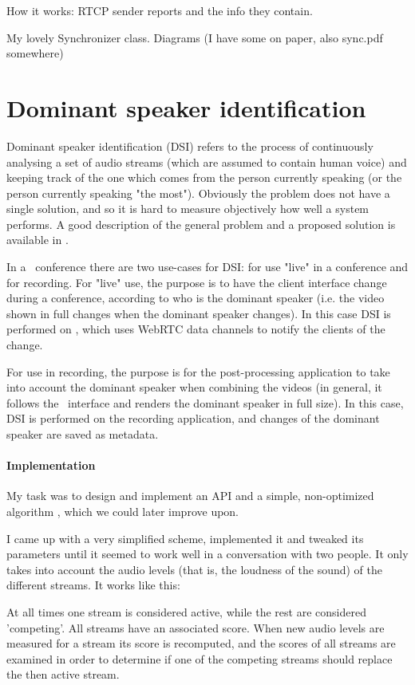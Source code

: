 \documentclass[twoside,openright,a4paper,11pt,english]{article}
\begin{document}
How it works: RTCP sender reports and the info they contain.

My lovely Synchronizer class. Diagrams (I have some on paper, also sync.pdf somewhere)

\section{Dominant speaker identification}
\label{dsd}
Dominant speaker identification (DSI) refers to the process of continuously analysing a set of audio streams
(which are assumed to contain human voice) and keeping track of the one which
comes from the person currently speaking (or the person currently speaking "the
most"). Obviously the problem does not have a single solution, and so it is hard
to measure objectively how well a system performs. A good description of the
general problem and a proposed solution is available in \cite{volfin2012}. 

In a \jm\ conference there are two use-cases for DSI: for use "live" in a
conference and for recording. 
For "live" use, the purpose is to have the client interface change during a
conference, according to who is the dominant speaker (i.e. the video shown in
full changes when the dominant speaker changes). In this case DSI is performed
on \jvb, which uses WebRTC data channels to notify the clients of the change.

For use in recording, the purpose is for the post-processing application to
take into account the dominant speaker when combining the videos (in general,
it follows the \jm\ interface and renders the dominant speaker in full size).
In this case, DSI is performed on the recording application, and changes of
the dominant speaker are saved as metadata.

\paragraph*{Implementation}
My task was to design and implement an API and a simple, non-optimized
algorithm , which we could later improve upon. 

I came up with a very simplified scheme, implemented it and tweaked its parameters until it seemed to
work well in a conversation with two people. It only takes into account the
audio levels (that is, the loudness of the sound) of the different streams. It
works like this:

At all times one stream is considered active, while the rest are considered
'competing'. All streams have an associated score. When new audio levels are
measured for a stream its score is recomputed,
and the scores of all streams are examined in order to determine if one of
the competing streams should replace the then active stream.
\end{document}
